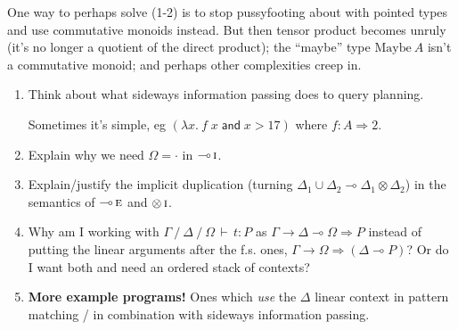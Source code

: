 \documentclass{article}
\newcommand\strong[1]{{\bfseries#1}}
\newcommand\G\Gamma
\newcommand\D\Delta
\renewcommand\O\Omega
\newcommand\lto\multimap        %
\newcommand\fto{\Rightarrow}
\newcommand\ox\otimes
\newcommand\tbool{\ensuremath{2}}
\newcommand\tmaybe[1]{\ensuremath{{#1}_{*}}}
\renewcommand\tmaybe[1]{\ensuremath{\text{Maybe}~{#1}}}
\newcommand\emptycx{{\cdot}}
\newcommand\cxsep{\mathbin{/}}
\newcommand\J[5]{{#3} \cxsep {#4} \cxsep {#5} \,\vdash\, {#1} : {#2}}
\newcommand\fnspace\:           %
\newcommand\fn[1]{\lambda{#1}.\fnspace}
\newcommand\<\;                 %
\newcommand\tand{\mathrel{\textsf{and}}}
\begin{document}
\noindent One way to perhaps solve (1-2) is to stop pussyfooting about with pointed types and use commutative monoids instead. But then tensor product becomes unruly (it's no longer a quotient of the direct product); the ``maybe'' type $\tmaybe A$ isn't a commutative monoid; and perhaps other complexities creep in.

\begin{enumerate}
\item Think about what sideways information passing does to query planning.

  Sometimes it's simple, eg $(\fn{x} f\<x \tand x > 17)$ where $f : A \fto \tbool$.

\item Explain why we need $\Omega=\emptycx$ in ${\lto}\,\textsc{i}$.
\item Explain/justify the implicit duplication (turning $\D_1 \cup \D_2 \lto \D_1 \ox \D_2$) in the semantics of ${\lto}\,\textsc{e}$ and ${\ox}\,\textsc{i}$.

\item Why am I working with $\J t P \G \D \O$ as $\G \to \D \lto \O \fto P$ instead of putting the linear arguments after the f.s. ones, $\G \to \O \fto (\D \lto P)$?
  Or do I want both and need an ordered stack of contexts?

\item \strong{More example programs!} Ones which \emph{use} the $\D$ linear context in pattern matching / in combination with sideways information passing.
\end{enumerate}


\end{document}
